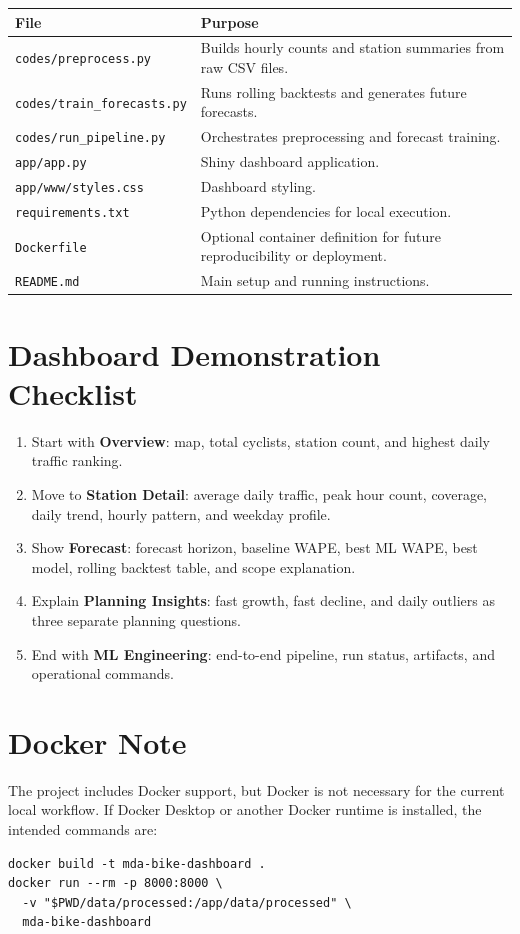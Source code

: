 \documentclass[11pt]{article}
\newcommand{\code}[1]{\texttt{#1}}
\begin{document}
\begin{tabularx}{0.95\textwidth}{lX}
\toprule
\textbf{File} & \textbf{Purpose} \\
\midrule
\code{codes/preprocess.py} & Builds hourly counts and station summaries from raw CSV files. \\
\code{codes/train\_forecasts.py} & Runs rolling backtests and generates future forecasts. \\
\code{codes/run\_pipeline.py} & Orchestrates preprocessing and forecast training. \\
\code{app/app.py} & Shiny dashboard application. \\
\code{app/www/styles.css} & Dashboard styling. \\
\code{requirements.txt} & Python dependencies for local execution. \\
\code{Dockerfile} & Optional container definition for future reproducibility or deployment. \\
\code{README.md} & Main setup and running instructions. \\
\bottomrule
\end{tabularx}

\section{Dashboard Demonstration Checklist}

\begin{enumerate}
    \item Start with \textbf{Overview}: map, total cyclists, station count, and highest daily traffic ranking.
    \item Move to \textbf{Station Detail}: average daily traffic, peak hour count, coverage, daily trend, hourly pattern, and weekday profile.
    \item Show \textbf{Forecast}: forecast horizon, baseline WAPE, best ML WAPE, best model, rolling backtest table, and scope explanation.
    \item Explain \textbf{Planning Insights}: fast growth, fast decline, and daily outliers as three separate planning questions.
    \item End with \textbf{ML Engineering}: end-to-end pipeline, run status, artifacts, and operational commands.
\end{enumerate}

\section{Docker Note}

The project includes Docker support, but Docker is not necessary for the current local workflow. If Docker Desktop or another Docker runtime is installed, the intended commands are:

\begin{verbatim}
docker build -t mda-bike-dashboard .
docker run --rm -p 8000:8000 \
  -v "$PWD/data/processed:/app/data/processed" \
  mda-bike-dashboard
\end{verbatim}
\end{document}
